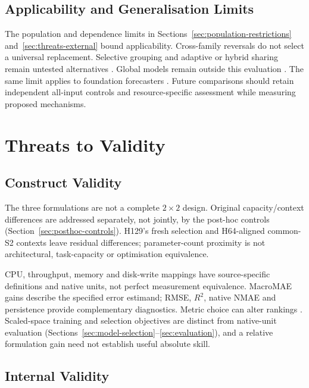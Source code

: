 \documentclass[a4paper,fleqn]{cas-dc}
\begin{document}
\subsection{Applicability and Generalisation Limits}
\label{sec:discussion-applicability}

The population and dependence limits in Sections~\ref{sec:population-restrictions}
and~\ref{sec:threats-external} bound applicability. Cross-family reversals do not
select a universal replacement. Selective grouping and adaptive or hybrid
sharing remain untested alternatives
\citep{Fifty2021TaskGroupings,Yu2020GradientSurgery,Nochumsohn2025MTLinear}.
Global models remain outside this evaluation
\citep{MonteroManso2021GlobalForecasting}.
The same limit applies to foundation forecasters
\citep{DiMenna2026RuntimeForecasting}. Future comparisons should retain
independent all-input controls and resource-specific assessment while
measuring proposed mechanisms.

\section{Threats to Validity}
\label{sec:threats}

\subsection{Construct Validity}
\label{sec:threats-construct}

The three formulations are not a complete $2\times2$ design. Original
capacity/context differences are addressed separately, not jointly, by the
post-hoc controls (Section~\ref{sec:posthoc-controls}). H129's fresh selection
and H64-aligned common-S2 contexts leave residual differences; parameter-count
proximity is not architectural, task-capacity or optimisation equivalence.

CPU, throughput, memory and disk-write mappings have source-specific
definitions and native units, not perfect measurement equivalence.
MacroMAE gains describe the specified error estimand; RMSE, $R^2$, native
NMAE and persistence provide complementary diagnostics. Metric choice can
alter rankings \citep{Hyndman2006Accuracy}. Scaled-space training and selection
objectives are distinct from native-unit evaluation
(Sections~\ref{sec:model-selection}--\ref{sec:evaluation}), and a relative
formulation gain need not establish useful absolute skill.

\subsection{Internal Validity}
\label{sec:threats-internal}
\end{document}
